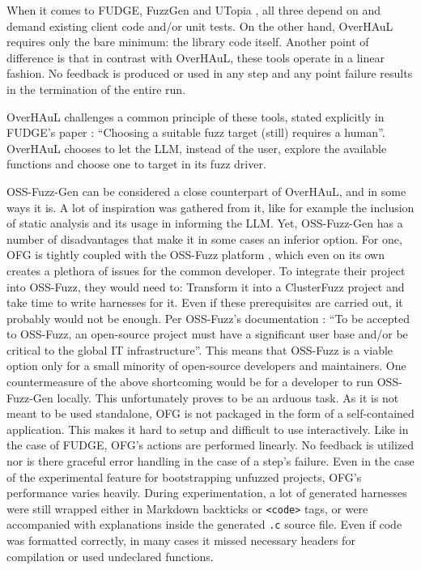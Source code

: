 \documentclass[
  a4paper,
]{scrreprt}
\theoremstyle{definition}
\theoremstyle{remark}
\begin{document}
When it comes to FUDGE, FuzzGen and UTopia
\autocite{utopia,fuzzgen,fudge}, all three depend on and demand existing
client code and/or unit tests. On the other hand, OverHAuL requires only
the bare minimum: the library code itself. Another point of difference
is that in contrast with OverHAuL, these tools operate in a linear
fashion. No feedback is produced or used in any step and any point
failure results in the termination of the entire run.

OverHAuL challenges a common principle of these tools, stated explicitly
in FUDGE's paper \autocite{fudge}: ``Choosing a suitable fuzz target
(still) requires a human''. OverHAuL chooses to let the LLM, instead of
the user, explore the available functions and choose one to target in
its fuzz driver.

OSS-Fuzz-Gen \autocite{oss-fuzz-gen} can be considered a close
counterpart of OverHAuL, and in some ways it is. A lot of inspiration
was gathered from it, like for example the inclusion of static analysis
and its usage in informing the LLM. Yet, OSS-Fuzz-Gen has a number of
disadvantages that make it in some cases an inferior option. For one,
OFG is tightly coupled with the OSS-Fuzz platform \autocite{oss-fuzz},
which even on its own creates a plethora of issues for the common
developer. To integrate their project into OSS-Fuzz, they would need to:
Transform it into a ClusterFuzz project \autocite{clusterfuzz} and take
time to write harnesses for it. Even if these prerequisites are carried
out, it probably would not be enough. Per OSS-Fuzz's documentation
\autocite{ossfuzzdocs2025}: ``To be accepted to OSS-Fuzz, an open-source
project must have a significant user base and/or be critical to the
global IT infrastructure''. This means that OSS-Fuzz is a viable option
only for a small minority of open-source developers and maintainers. One
countermeasure of the above shortcoming would be for a developer to run
OSS-Fuzz-Gen locally. This unfortunately proves to be an arduous task.
As it is not meant to be used standalone, OFG is not packaged in the
form of a self-contained application. This makes it hard to setup and
difficult to use interactively. Like in the case of FUDGE, OFG's actions
are performed linearly. No feedback is utilized nor is there graceful
error handling in the case of a step's failure. Even in the case of the
experimental feature for bootstrapping unfuzzed projects, OFG's
performance varies heavily. During experimentation, a lot of generated
harnesses were still wrapped either in Markdown backticks or
\texttt{\textless{}code\textgreater{}} tags, or were accompanied with
explanations inside the generated \texttt{.c} source file. Even if code
was formatted correctly, in many cases it missed necessary headers for
compilation or used undeclared functions.
\end{document}
